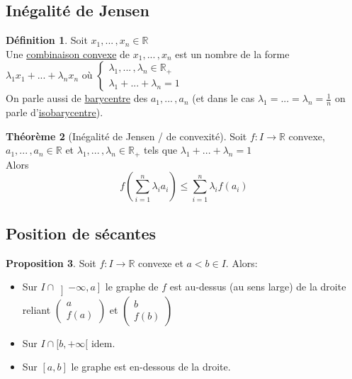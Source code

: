 \documentclass[10pt,a4paper]{article}
\theoremstyle{definition}
\newtheorem{proposition}{Proposition}[section]
\newtheorem{theorem}[proposition]{Théorème}
\newtheorem{definition}[proposition]{Définition}
\begin{document}
\subsection{Inégalité de Jensen}
\begin{definition}
Soit $x_1, ...\, , x_n \in \mathbb{R}$ \\
Une \uline{combinaison convexe} de $x_1, ...\, , x_n$ est un nombre de la forme $\lambda_1 x_1 + ... + \lambda_n x_n$ où $\begin{cases}
\lambda_1, ...\, , \lambda_n \in \mathbb{R}_+ \\
\lambda_1 + ... + \lambda_n = 1
\end{cases}$  \\
On parle aussi de \uline{barycentre} des $a_1, ...\, , a_n$ (et dans le cas $\lambda_1 = ... = \lambda_n = \frac{1}{n}$ on parle d'\uline{isobarycentre}).
\end{definition}
\begin{theorem}[Inégalité de Jensen / de convexité]
Soit $f: I \to \mathbb{R}$ convexe, $a_1, ...\, , a_n \in \mathbb{R}$ et $\lambda_1, ...\, , \lambda_n \in \mathbb{R}_+$ tels que $\lambda_1 + ... + \lambda_n = 1$ \\
Alors
\[f\left(\sum_{i = 1}^n \lambda_i a_i\right) \leq \sum_{i = 1}^n \lambda_i f(a_i)\]
\end{theorem}

\subsection{Position de sécantes}
\begin{proposition}
Soit $f:I \to \mathbb{R}$ convexe et $a < b \in I$. Alors:
\begin{itemize}
\item Sur $I \cap \left]-\infty, a\right]$ le graphe de $f$ est au-dessus (au sens large) de la droite reliant $\begin{pmatrix} a \\ f(a) \end{pmatrix}$ et $\begin{pmatrix} b \\ f(b) \end{pmatrix}$
\item Sur $I \cap [b, +\infty[$ idem.
\item Sur $[a, b]$ le graphe est en-dessous de la droite.
\end{itemize}
\end{proposition}
\end{document}
